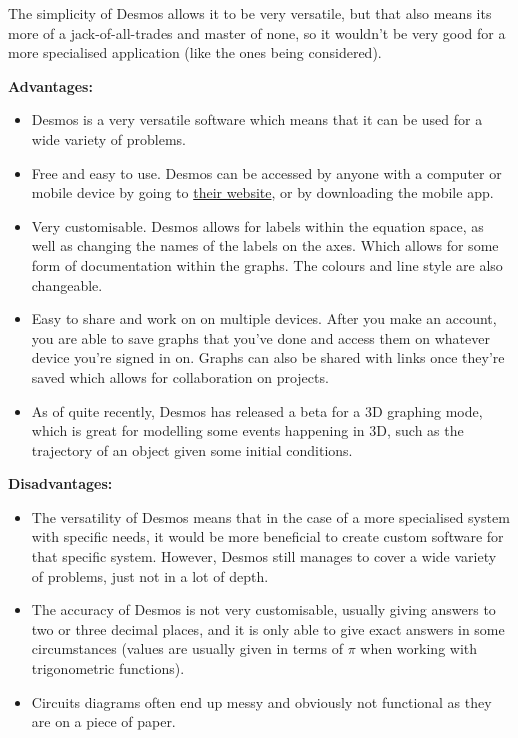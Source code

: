 \documentclass[11pt]{article}
\begin{document}
                The simplicity of Desmos allows it to be very versatile, but that also means its more of a jack-of-all-trades and master of none, so it wouldn't be very good for a more specialised application (like the ones being considered).

                \pagebreak

                \textbf{Advantages:}
                \begin{itemize}
                    \item Desmos is a very versatile software which means that it can be used for a wide variety of problems. 
                    \item Free and easy to use. Desmos can be accessed by anyone with a computer or mobile device by going to \href{https://www.desmos.com/calculator}{their website}, or by downloading the mobile app.
                    \item Very customisable. Desmos allows for labels within the equation space, as well as changing the names of the labels on the axes. Which allows for some form of documentation within the graphs. The colours and line style are also changeable.
                    \item Easy to share and work on on multiple devices. After you make an account, you are able to save graphs that you've done and access them on whatever device you're signed in on. Graphs can also be shared with links once they're saved which allows for collaboration on projects.
                    \item As of quite recently, Desmos has released a beta for a 3D graphing mode, which is great for modelling some events happening in 3D, such as the trajectory of an object given some initial conditions.
                \end{itemize}


                \textbf{Disadvantages:}
                \begin{itemize}
                    \item The versatility of Desmos means that in the case of a more specialised system with specific needs, it would be more beneficial to create custom software for that specific system. However, Desmos still manages to cover a wide variety of problems, just not in a lot of depth.
                    \item The accuracy of Desmos is not very customisable, usually giving answers to two or three decimal places, and it is only able to give exact answers in some circumstances (values are usually given in terms of $\pi$ when working with trigonometric functions).
                    \item Circuits diagrams often end up messy and obviously not functional as they are on a piece of paper.
                \end{itemize}
\end{document}
